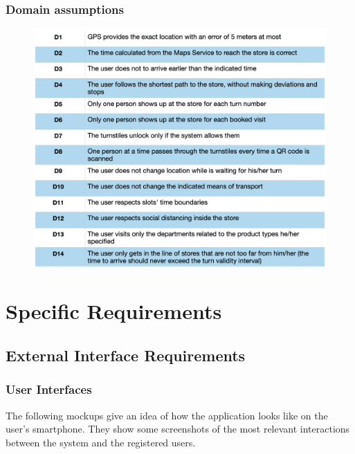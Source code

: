 \documentclass{article}
\begin{document}
\subsubsection{Domain assumptions}
\begin{figure}[H]
  \includegraphics[width=\linewidth]{Domains.png}
  
\end{figure}

\section{Specific Requirements}
\subsection{External Interface Requirements}
\subsubsection{User Interfaces}
The following mockups give an idea of how the application looks like on the user’s smartphone. They show some screenshots of the most relevant interactions between the system and the registered users.
\end{document}
